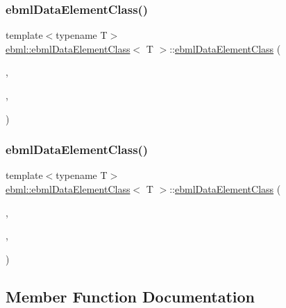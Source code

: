 \subsubsection{\texorpdfstring{ebml\+Data\+Element\+Class()}{ebmlDataElementClass()}\hspace{0.1cm}{\footnotesize\ttfamily [5/6]}}
{\footnotesize\ttfamily template$<$typename T$>$ \\
\mbox{\hyperlink{classebml_1_1ebmlDataElementClass}{ebml\+::ebml\+Data\+Element\+Class}}$<$ T $>$\+::\mbox{\hyperlink{classebml_1_1ebmlDataElementClass}{ebml\+Data\+Element\+Class}} (\begin{DoxyParamCaption}\item[{\mbox{\hyperlink{namespaceebml_a86c5f604ddf12a74aa9812e997a58691}{ebml\+I\+D\+\_\+t}}}]{,  }\item[{const std\+::wstring \&}]{,  }\item[{const T \&}]{ }\end{DoxyParamCaption})}

\mbox{\label{classebml_1_1ebmlDataElementClass_a3af7912dc41d400db7b1347766fef924}} 
\subsubsection{\texorpdfstring{ebml\+Data\+Element\+Class()}{ebmlDataElementClass()}\hspace{0.1cm}{\footnotesize\ttfamily [6/6]}}
{\footnotesize\ttfamily template$<$typename T$>$ \\
\mbox{\hyperlink{classebml_1_1ebmlDataElementClass}{ebml\+::ebml\+Data\+Element\+Class}}$<$ T $>$\+::\mbox{\hyperlink{classebml_1_1ebmlDataElementClass}{ebml\+Data\+Element\+Class}} (\begin{DoxyParamCaption}\item[{\mbox{\hyperlink{namespaceebml_a86c5f604ddf12a74aa9812e997a58691}{ebml\+I\+D\+\_\+t}}}]{,  }\item[{const std\+::wstring \&}]{,  }\item[{T \&\&}]{ }\end{DoxyParamCaption})}



\subsection{Member Function Documentation}
\mbox{\label{classebml_1_1ebmlDataElementClass_a481cda6ab9f96ab21434daabd9ad1ed9}} 
